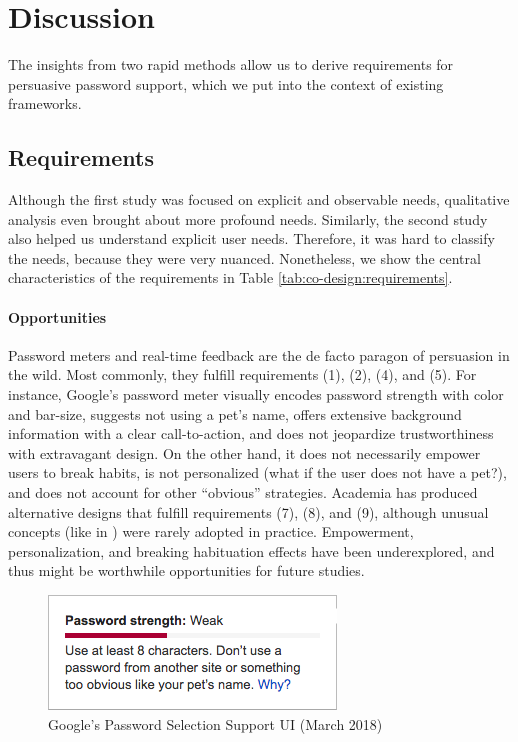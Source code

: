 \section{Discussion}
The insights from two rapid methods allow us to derive requirements for persuasive password support, which we put into the context of existing frameworks. 

\subsection{Requirements}
Although the first study was focused on explicit and observable needs, qualitative analysis even brought about more profound needs. Similarly, the second study also helped us understand explicit user needs. Therefore, it was hard to classify the needs, because they were very nuanced. Nonetheless, we show the central characteristics of the requirements in Table \ref{tab:co-design:requirements}.


\paragraph{Opportunities} Password meters and real-time feedback are the de facto paragon of persuasion in the wild.  Most commonly, they fulfill requirements (1), (2), (4), and (5). For instance, Google's password meter visually encodes password strength with color and bar-size, suggests not using a pet's name, offers extensive background information with a clear call-to-action, and does not jeopardize trustworthiness with extravagant design. On the other hand, it does not necessarily empower users to break habits, is not personalized (what if the user does not have a pet?), and does not account for other ``obvious'' strategies. Academia has produced alternative designs that fulfill requirements (7), (8), and (9), although unusual concepts (like in \cite{Ur2012HowDoesYourPasswordMeasureUp}) were rarely adopted in practice. Empowerment, personalization, and breaking habituation effects have been underexplored, and thus might be worthwhile opportunities for future studies.

\begin{figure}
	\centering
	\includegraphics[width=0.4\linewidth]{figures/co-design/google-pw-meter}
	\caption{\label{fig:co-design:google-pw-meter} Google's Password Selection Support UI (March 2018)}
\end{figure}

